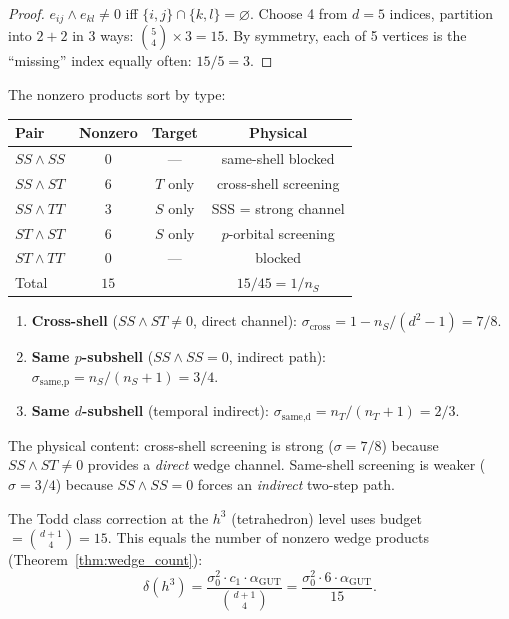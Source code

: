 \begin{remark}
\begin{proof}
$e_{ij} \wedge e_{kl} \neq 0$ iff $\{i,j\} \cap \{k,l\} = \varnothing$.  Choose 4 from $d=5$ indices, partition into $2{+}2$ in $3$ ways: $\binom{5}{4} \times 3 = 15$.  By symmetry, each of 5 vertices is the ``missing'' index equally often: $15/5 = 3$.
\end{proof}

The nonzero products sort by type:
\begin{center}
\begin{tabular}{lccc}
\hline
Pair & Nonzero & Target & Physical \\
\hline
$SS \wedge SS$ & $0$ & --- & same-shell blocked \\
$SS \wedge ST$ & $6$ & $T$ only & cross-shell screening \\
$SS \wedge TT$ & $3$ & $S$ only & SSS = strong channel \\
$ST \wedge ST$ & $6$ & $S$ only & $p$-orbital screening \\
$ST \wedge TT$ & $0$ & --- & blocked \\
\hline
Total & $15$ & & $15/45 = 1/n_S$ \\
\hline
\end{tabular}
\end{center}

\begin{theorem}
\label{thm:sigma_wedge}
\leavevmode
\begin{enumerate}
\item \textbf{Cross-shell} ($SS \wedge ST \neq 0$, direct channel):
$\sigma_\text{cross} = 1 - n_S/(d^2\!-\!1) = 7/8$.

\item \textbf{Same $p$-subshell} ($SS \wedge SS = 0$, indirect path):
$\sigma_\text{same,p} = n_S/(n_S\!+\!1) = 3/4$.

\item \textbf{Same $d$-subshell} (temporal indirect):
$\sigma_\text{same,d} = n_T/(n_T\!+\!1) = 2/3$.
\end{enumerate}
\end{theorem}

The physical content: cross-shell screening is strong ($\sigma = 7/8$) because $SS \wedge ST \neq 0$ provides a \emph{direct} wedge channel.  Same-shell screening is weaker ($\sigma = 3/4$) because $SS \wedge SS = 0$ forces an \emph{indirect} two-step path.

\begin{theorem}
The Todd class correction at the $h^3$ (tetrahedron) level uses budget $= \binom{d+1}{4} = 15$.  This equals the number of nonzero wedge products (Theorem~\ref{thm:wedge_count}):
\[
\delta(h^3) = \frac{\sigma_0^2 \cdot c_1 \cdot \alpha_\text{GUT}}{\binom{d+1}{4}}
= \frac{\sigma_0^2 \cdot 6 \cdot \alpha_\text{GUT}}{15}.
\]
\end{theorem}


\end{remark}
